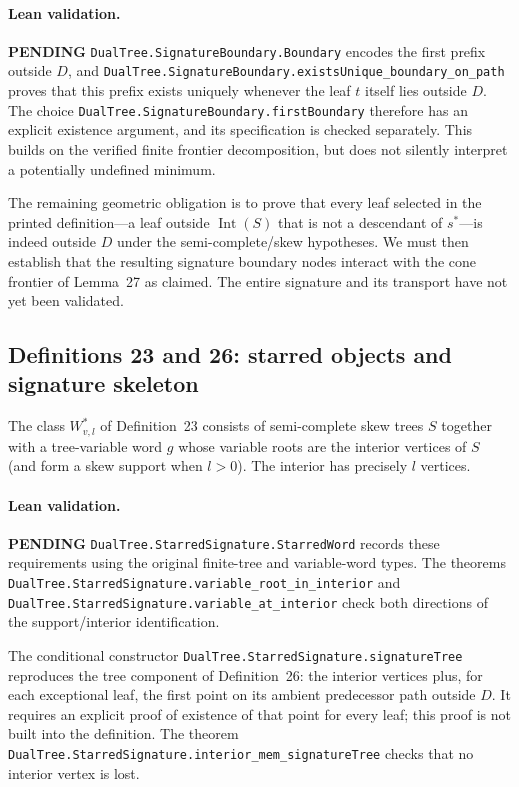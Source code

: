 \documentclass[11pt]{article}
\newcommand{\todo}{\textcolor{gray!70!black}{\textbf{PENDING}}}
\newcommand{\lean}[1]{\texttt{#1}}
\begin{document}
\paragraph{Lean validation.} \todo
\lean{DualTree.SignatureBoundary.Boundary} encodes the first prefix
outside $D$, and
\lean{DualTree.SignatureBoundary.existsUnique_boundary_on_path}
proves that this prefix exists uniquely whenever the leaf $t$ itself
lies outside $D$.  The choice
\lean{DualTree.SignatureBoundary.firstBoundary} therefore has an
explicit existence argument, and its specification is checked separately.
This builds on the verified finite frontier decomposition, but does not
silently interpret a potentially undefined minimum.

The remaining geometric obligation is to prove that every leaf selected
in the printed definition---a leaf outside $\operatorname{Int}(S)$ that is
not a descendant of $s^*$---is indeed outside $D$ under the
semi-complete/skew hypotheses.  We must then establish that the resulting
signature boundary nodes interact with the cone frontier of Lemma~27
as claimed.  The entire signature and its transport have not yet been
validated.

\subsection{Definitions 23 and 26: starred objects and signature skeleton}
The class $W^*_{v,l}$ of Definition~23 consists of semi-complete skew
trees $S$ together with a tree-variable word $g$ whose variable roots
are the interior vertices of $S$ (and form a skew support when $l>0$).
The interior has precisely $l$ vertices.

\paragraph{Lean validation.} \todo
\lean{DualTree.StarredSignature.StarredWord} records these requirements
using the original finite-tree and variable-word types.  The theorems
\lean{DualTree.StarredSignature.variable_root_in_interior} and
\lean{DualTree.StarredSignature.variable_at_interior} check both
directions of the support/interior identification.

The conditional constructor
\lean{DualTree.StarredSignature.signatureTree} reproduces the tree
component of Definition~26: the interior vertices plus, for each
exceptional leaf, the first point on its ambient predecessor path
outside $D$.  It requires an explicit proof of existence of that
point for every leaf; this proof is not built into the definition.
The theorem
\lean{DualTree.StarredSignature.interior_mem_signatureTree}
checks that no interior vertex is lost.
\end{document}
